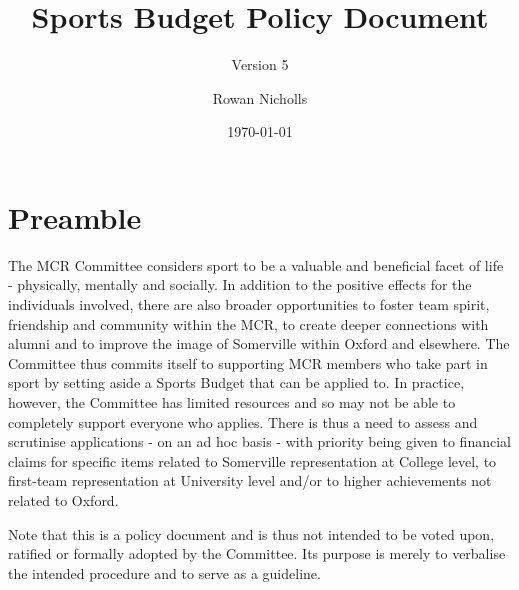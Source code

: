 

\title{Sports Budget Policy Document}
\subtitle{Version 5}
\author{Rowan Nicholls}
\date{\today}



\section*{Preamble}
The MCR Committee considers sport to be a valuable and beneficial facet of life - physically, mentally and socially. In addition to the positive effects for the individuals involved, there are also broader opportunities to foster team spirit, friendship and community within the MCR, to create deeper connections with alumni and to improve the image of Somerville within Oxford and elsewhere. The Committee thus commits itself to supporting MCR members who take part in sport by setting aside a Sports Budget that can be applied to. In practice, however, the Committee has limited resources and so may not be able to completely support everyone who applies. There is thus a need to assess and scrutinise applications - on an ad hoc basis - with priority being given to financial claims for specific items related to Somerville representation at College level, to first-team representation at University level and/or to higher achievements not related to Oxford.

Note that this is a policy document and is thus not intended to be voted upon, ratified or formally adopted by the Committee. Its purpose is merely to verbalise the intended procedure and to serve as a guideline.

